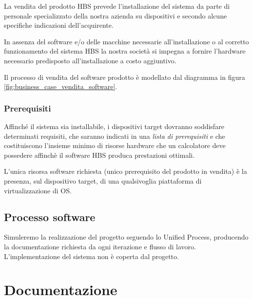 \documentclass[10pt]{softeng} %
\begin{document}
La vendita del prodotto HBS prevede l'installazione del sistema da parte di personale specializzato della nostra azienda su dispositivi e secondo alcune specifiche indicazioni dell'acquirente.

In assenza del software e/o delle macchine necessarie all'installazione o al corretto funzionamento del sistema HBS la nostra societ\`a si impegna a fornire l’hardware necessario predisposto all’installazione a costo aggiuntivo.

Il processo di vendita del software prodotto \`e modellato dal diagramma in figura \ref{fig:business_case_vendita_software}.

\subsubsection{Prerequisiti}

Affinch\'e il sistema sia installabile, i dispositivi target dovranno soddisfare determinati requisiti, che saranno indicati in una \emph{lista di prerequisiti} e che costituiscono l'insieme minimo di risorse hardware che un calcolatore deve possedere affinchè il software HBS produca prestazioni ottimali.

L'unica risorsa software richiesta (unico prerequisito del prodotto in vendita) è la presenza, sul dispositivo target, di una qualsivoglia piattaforma di virtualizzazione di OS.

\subsection{Processo software}

Simuleremo la realizzazione del progetto seguendo lo Unified Process, producendo la documentazione richiesta da ogni iterazione e flusso di lavoro.
L'implementazione del sistema non \`e coperta dal progetto.

\section{Documentazione}
\end{document}
